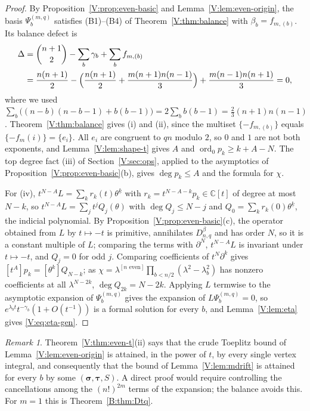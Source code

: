 \documentclass[11pt,a4paper]{article}
\theoremstyle{definition}
\theoremstyle{remark}
\newtheorem{remark}[theorem]{Remark}
\newcommand{\C}{\mathbb C}
\newcommand{\ff}[2]{#1^{\underline{#2}}}
\DeclareMathOperator{\ord}{ord}
\numberwithin{equation}{section}
\begin{document}
\begin{proof}
By Proposition~\ref{V:prop:even-basic} and Lemma~\ref{V:lem:even-origin}, the basis $\Psi^{(m,q)}_b$ satisfies (B1)--(B4) of Theorem~\ref{V:thm:balance} with $\beta_b=f_{m,(b)}$. Its balance defect is
\[
\begin{aligned}
\Delta&=\binom{n+1}2-\sum_b\gamma_b+\sum_bf_{m,(b)}\\
&=\frac{n(n+1)}2-\Bigl(\frac{n(n+1)}2+\frac{m(n+1)n(n-1)}3\Bigr)+\frac{m(n-1)n(n+1)}3=0,
\end{aligned}
\]
where we used $\sum_b\bigl((n-b)(n-b-1)+b(b-1)\bigr)=2\sum_bb(b-1)=\frac23(n+1)n(n-1)$. Theorem~\ref{V:thm:balance} gives (i) and (ii), since the multiset $\{-f_{m,(b)}\}$ equals $\{-f_m(i)\}=\{e_i\}$. All $e_i$ are congruent to $qn$ modulo $2$, so $0$ and $1$ are not both exponents, and Lemma~\ref{V:lem:shape-t} gives $A$ and $\ord_0p_k\ge k+A-N$. The top degree fact (iii) of Section~\ref{V:sec:ops}, applied to the asymptotics of Proposition~\ref{V:prop:even-basic}(b), gives $\deg p_k\le A$ and the formula for $\chi$.

For (iv), $t^{N-A}L=\sum_kr_k(t)\ff\theta k$ with $r_k=t^{N-A-k}p_k\in\C[t]$ of degree at most $N-k$, so $t^{N-A}L=\sum_jt^jQ_j(\theta)$ with $\deg Q_j\le N-j$ and $Q_0=\sum_kr_k(0)\ff\theta k$, the indicial polynomial. By Proposition~\ref{V:prop:even-basic}(c), the operator obtained from $L$ by $t\mapsto-t$ is primitive, annihilates $D^\beta_{n,q}$ and has order $N$, so it is a constant multiple of $L$; comparing the terms with $\partial^N$, $t^{N-A}L$ is invariant under $t\mapsto-t$, and $Q_j=0$ for odd $j$. Comparing coefficients of $t^N\partial^k$ gives $[t^A]p_k=[\theta^k]Q_{N-k}$; as $\chi=\lambda^{[n\text{ even}]}\prod_{b<n/2}(\lambda^2-\lambda_b^2)$ has nonzero coefficients at all $\lambda^{N-2k}$, $\deg Q_{2k}=N-2k$. Applying $L$ termwise to the asymptotic expansion of $\Psi^{(m,q)}_b$ gives the expansion of $L\Psi^{(m,q)}_b=0$, so $e^{\lambda_bt}t^{-\gamma_b}(1+O(t^{-1}))$ is a formal solution for every $b$, and Lemma~\ref{V:lem:eta} gives \eqref{V:eq:eta-gen}.
\end{proof}

\begin{remark}
Theorem~\ref{V:thm:even-t}(ii) says that the crude Toeplitz bound of Lemma~\ref{V:lem:even-origin} is attained, in the power of $t$, by every single vertex integral, and consequently that the bound of Lemma~\ref{V:lem:mdrift} is attained for every $b$ by some $(\boldsymbol\sigma,\boldsymbol\tau,S)$. A direct proof would require controlling the cancellations among the $(n!)^{2m}$ terms of the expansion; the balance avoids this. For $m=1$ this is Theorem~\ref{B:thm:Dtq}.
\end{remark}
\end{document}

